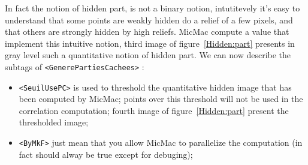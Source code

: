 In fact the notion of hidden part, is not a binary notion, intutitevely it's
easy to understand that some points are weakly hidden do a relief of a few pixels,
and that others are strongly hidden by high reliefs. MicMac compute a value
that implement this intuitive notion, third image of figure~\ref{Hidden:part}
presents in gray level such a quantitative notion of hidden part.
We can now describe the subtags of {\tt <GenerePartiesCachees>} :


\begin{itemize}
   \item  {\tt  <SeuilUsePC>} is used to  threshold the quantitative hidden
          image that has been computed by MicMac; points over this threshold
          will not be used in the correlation computation; fourth image of
          figure~\ref{Hidden:part} present the thresholded image;
   \item  {\tt  <ByMkF>} just mean that you allow MicMac to parallelize the 
          computation (in fact should alway be true except for debuging);
\end{itemize}


